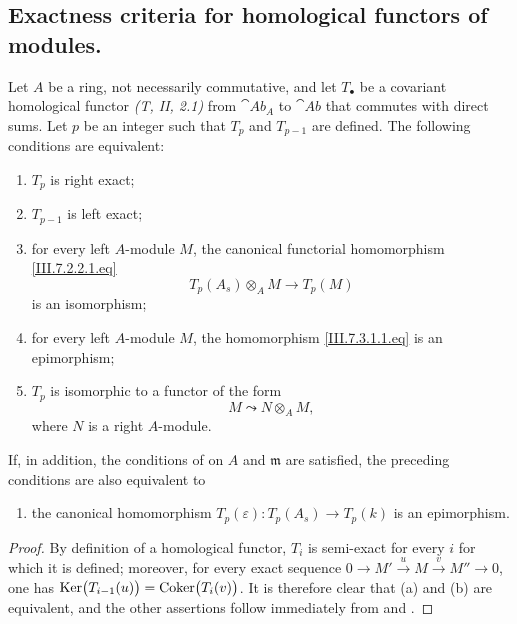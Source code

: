 \subsection{Exactness criteria for homological functors of modules.}
\label{subsection:III.7.3}

\begin{proposition}[7.3.1]
\label{III.7.3.1}
Let $A$ be a ring, not necessarily commutative, and let
$T_\bullet$ be a covariant homological functor
\emph{(T, II, 2.1)} from $\cat{Ab}_A$ to $\cat{Ab}$ that
commutes with direct sums.  Let $p$ be an integer such that
$T_p$ and $T_{p-1}$ are defined.  The following conditions are
equivalent:
\begin{enumerate}
  \item[(a)] $T_p$ is right exact;
  \item[(b)] $T_{p-1}$ is left exact;


  \item[(c)] for every left $A$-module $M$, the canonical
    functorial homomorphism \eqref{III.7.2.2.1.eq}
    \[
      T_p(A_s)\otimes_A M
      \longrightarrow
      T_p(M)
      \tag{7.3.1.1}\label{III.7.3.1.1.eq}
    \]
    is an isomorphism;
  \item[(d)] for every left $A$-module $M$, the homomorphism
    \eqref{III.7.3.1.1.eq} is an epimorphism;
  \item[(e)] $T_p$ is isomorphic to a functor of the form
    \[
      M\leadsto N\otimes_A M,
    \]
    where $N$ is a right $A$-module.
\end{enumerate}
If, in addition, the conditions of  on $A$ and
$\mathfrak m$ are satisfied, the preceding conditions are also
equivalent to
\begin{enumerate}
  \item[(f)] the canonical homomorphism $T_p(\varepsilon):T_p(A_s)\longrightarrow T_p(k)$
    is an epimorphism.
\end{enumerate}
\end{proposition}

\begin{proof}
By definition of a homological functor, $T_i$ is semi-exact for
every $i$ for which it is defined; moreover, for every exact
sequence $0\longrightarrow M'\xrightarrow{u}M\xrightarrow{v}M''\longrightarrow0$,
one has $\operatorname{Ker}\bigl(T_{i-1}(u)\bigr)
=
\operatorname{Coker}\bigl(T_i(v)\bigr)$.
It is therefore clear that (a) and (b) are equivalent, and the
other assertions follow immediately from  and
.
\end{proof}

